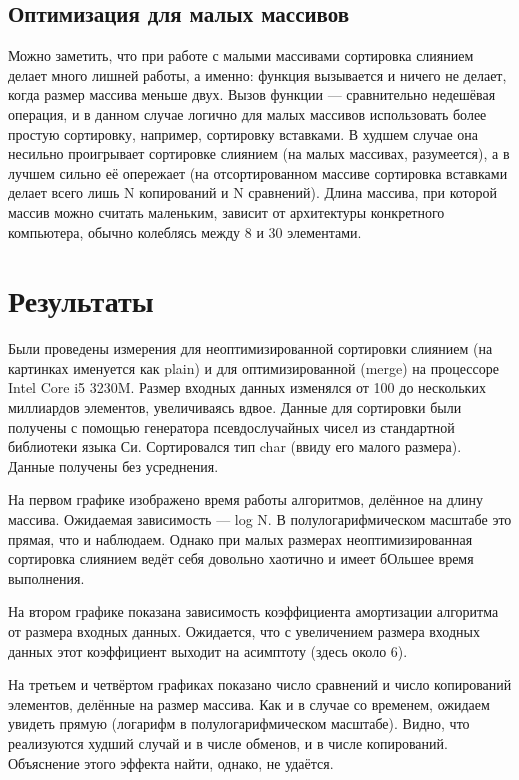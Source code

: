 \documentclass[14pt]{extarticle}
\begin{document}
\subsection*{Оптимизация для малых массивов}
Можно заметить, что при работе с малыми массивами сортировка слиянием делает много лишней работы, а именно: функция вызывается и ничего не делает, когда размер массива меньше двух. Вызов функции --- сравнительно недешёвая операция, и в данном случае логично для малых массивов использовать более простую сортировку, например, сортировку вставками. В худшем случае она несильно проигрывает сортировке слиянием (на малых массивах, разумеется), а в лучшем сильно её опережает (на отсортированном массиве сортировка вставками делает всего лишь N копирований и N сравнений). Длина массива, при которой массив можно считать маленьким, зависит от архитектуры конкретного компьютера, обычно колеблясь между 8 и 30 элементами.

\section*{Результаты}
Были проведены измерения для неоптимизированной сортировки слиянием (на картинках именуется как plain) и для оптимизированной (merge) на процессоре Intel Core i5 3230M. Размер входных данных изменялся от 100 до нескольких миллиардов элементов, увеличиваясь вдвое. Данные для сортировки были получены с помощью генератора псевдослучайных чисел из стандартной библиотеки языка Си. Сортировался тип char (ввиду его малого размера). Данные получены без усреднения.

На первом графике изображено время работы алгоритмов, делённое на длину массива. Ожидаемая зависимость --- log N. В полулогарифмическом масштабе это прямая, что и наблюдаем. Однако при малых размерах неоптимизированная сортировка слиянием ведёт себя довольно хаотично и имеет бОльшее время выполнения.

На втором графике показана зависимость коэффициента амортизации алгоритма от размера входных данных. Ожидается, что с увеличением размера входных данных этот коэффициент выходит на асимптоту (здесь около 6).

На третьем и четвёртом графиках показано число сравнений и число копирований элементов, делённые на размер массива. Как и в случае со временем, ожидаем увидеть прямую (логарифм в полулогарифмическом масштабе). Видно, что реализуются худший случай и в числе обменов, и в числе копирований. Объяснение этого эффекта найти, однако, не удаётся.
\end{document}
